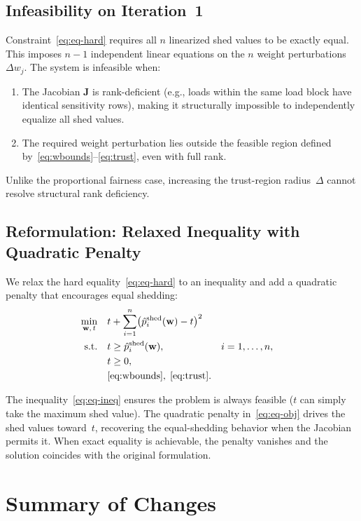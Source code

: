 \documentclass[11pt]{article}
\begin{document}
\subsection{Infeasibility on Iteration~1}

Constraint~\eqref{eq:eq-hard} requires all $n$ linearized shed values to be exactly equal.
This imposes $n-1$ independent linear equations on the $n$ weight perturbations $\Delta w_j$.
The system is infeasible when:
\begin{enumerate}
    \item The Jacobian $\mathbf{J}$ is rank-deficient (e.g., loads within the same load block have identical sensitivity rows), making it structurally impossible to independently equalize all shed values.
    \item The required weight perturbation lies outside the feasible region defined by~\eqref{eq:wbounds}--\eqref{eq:trust}, even with full rank.
\end{enumerate}
Unlike the proportional fairness case, increasing the trust-region radius~$\Delta$ cannot resolve structural rank deficiency.

\subsection{Reformulation: Relaxed Inequality with Quadratic Penalty}

We relax the hard equality~\eqref{eq:eq-hard} to an inequality and add a quadratic penalty that encourages equal shedding:
\begin{align}
    \min_{\mathbf{w},\,t} \quad & t + \sum_{i=1}^{n} \bigl(\hat{p}_i^{\mathrm{shed}}(\mathbf{w}) - t\bigr)^2 \label{eq:eq-obj}\\
    \text{s.t.} \quad
    & t \ge \hat{p}_i^{\mathrm{shed}}(\mathbf{w}), & i &= 1,\dots,n, \label{eq:eq-ineq}\\
    & t \ge 0, \notag \\
    & \eqref{eq:wbounds},\;\eqref{eq:trust}. \notag
\end{align}

The inequality~\eqref{eq:eq-ineq} ensures the problem is always feasible ($t$ can simply take the maximum shed value).
The quadratic penalty in~\eqref{eq:eq-obj} drives the shed values toward~$t$, recovering the equal-shedding behavior when the Jacobian permits it.
When exact equality is achievable, the penalty vanishes and the solution coincides with the original formulation.

\section{Summary of Changes}
\end{document}
